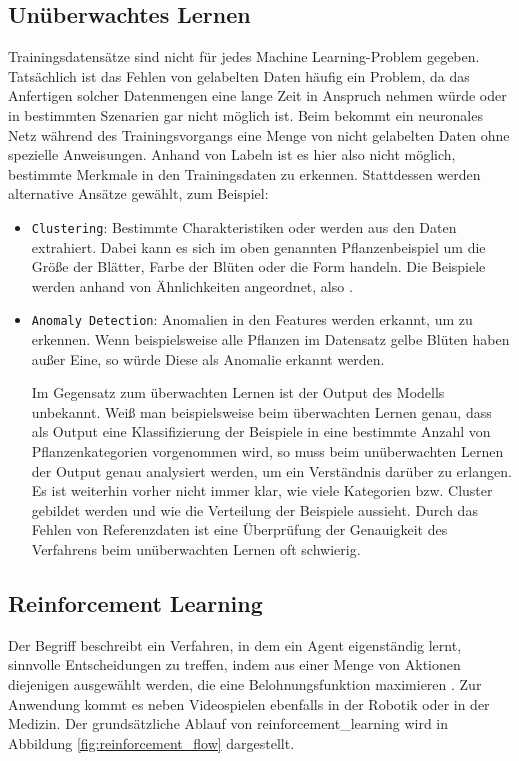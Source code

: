 \subsection{Unüberwachtes Lernen}\label{unsupervised_learning}
Trainingsdatensätze sind nicht für jedes Machine Learning-Problem gegeben. Tatsächlich ist das Fehlen von gelabelten Daten häufig ein Problem, da das Anfertigen solcher Datenmengen eine lange Zeit in Anspruch nehmen würde oder in bestimmten Szenarien gar nicht möglich ist.
Beim  bekommt ein neuronales Netz während des Trainingsvorgangs eine Menge von nicht gelabelten Daten ohne spezielle Anweisungen. Anhand von Labeln ist es hier also nicht möglich, bestimmte Merkmale in den Trainingsdaten zu erkennen. Stattdessen werden alternative Ansätze gewählt, zum Beispiel:
\begin{itemize}
    \item \texttt{Clustering}: Bestimmte Charakteristiken oder  werden aus den Daten extrahiert. Dabei kann es sich im oben genannten Pflanzenbeispiel um die Größe der Blätter, Farbe der Blüten oder die Form handeln. Die Beispiele werden anhand von Ähnlichkeiten angeordnet, also .
    \item \texttt{Anomaly Detection}: Anomalien in den Features werden erkannt, um  zu erkennen. Wenn beispielsweise alle Pflanzen im Datensatz gelbe Blüten haben außer Eine, so würde Diese als Anomalie erkannt werden.

Im Gegensatz zum überwachten Lernen ist der Output des Modells unbekannt. Weiß man beispielsweise beim überwachten Lernen genau, dass als Output eine Klassifizierung der Beispiele in eine bestimmte Anzahl von Pflanzenkategorien vorgenommen wird, so muss beim unüberwachten Lernen der Output genau analysiert werden, um ein Verständnis darüber zu erlangen. Es ist weiterhin vorher nicht immer klar, wie viele Kategorien bzw. Cluster gebildet werden und wie die Verteilung der Beispiele aussieht.
Durch das Fehlen von Referenzdaten ist eine Überprüfung der Genauigkeit des Verfahrens beim unüberwachten Lernen oft schwierig.
\end{itemize}


\subsection{Reinforcement Learning}\label{reinforcement_learning_intro}
Der Begriff  beschreibt ein Verfahren, in dem ein Agent eigenständig lernt, sinnvolle Entscheidungen zu treffen, indem aus einer Menge von Aktionen diejenigen ausgewählt werden, die eine Belohnungsfunktion maximieren \cite{ai_for_game_devs} \cite{reinforcement_introduction_book} \cite{dammann_reinforcement} \cite{alzantot_0} \cite{intel_ai_demystifying}. Zur Anwendung kommt es neben Videospielen ebenfalls in der Robotik oder in der Medizin. Der grundsätzliche Ablauf von \ac{reinforcement_learning} wird in Abbildung \ref{fig:reinforcement_flow} dargestellt.

